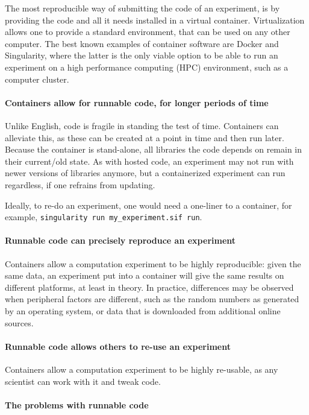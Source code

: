 The most reproducible way of submitting the code of an experiment,
is by providing the code and all it needs 
installed in a virtual container.
Virtualization allows one to provide a standard environment,
that can be used on any other computer.
The best known examples of container software are Docker and Singularity,
where the latter is the only viable option to be able to run
an experiment on a high performance computing (HPC) environment,
such as a computer cluster.

\paragraph{Containers allow for runnable code, for longer periods of time}

Unlike English, code is fragile in standing the test of time.
Containers can alleviate this, as these can be created at a point
in time and then run later. Because the container is stand-alone,
all libraries the code depends on remain in their current/old state.
As with hosted code, an experiment may not run with newer versions
of libraries anymore, but a containerized experiment can run regardless, if
one refrains from updating.

Ideally, to re-do an experiment, one would need a one-liner to a container,
for example, \verb|singularity run my_experiment.sif run|.

\paragraph{Runnable code can precisely reproduce an experiment}

Containers allow a computation experiment to be highly reproducible:
given the same data, an experiment put into a container will give
the same results on different platforms, at least in theory.
In practice, differences may be observed when peripheral factors
are different, such as the random numbers as generated by an operating
system, or data that is downloaded from additional online sources.

\paragraph{Runnable code allows others to re-use an experiment}

Containers allow a computation experiment to be highly re-usable,
as any scientist can work with it and tweak code.

\paragraph{The problems with runnable code}

